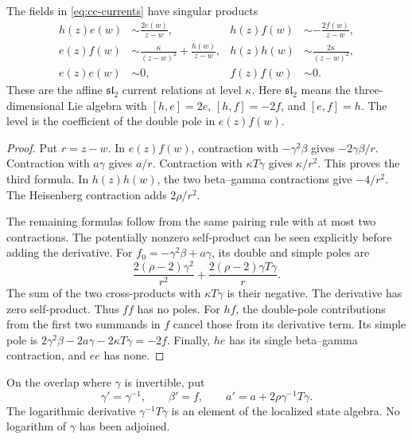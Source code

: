\begin{proposition}\label{prop:cc-current-poles}
The fields in \eqref{eq:cc-currents} have singular products
\begin{align*}
 h(z)e(w)&\sim\frac{2e(w)}{z-w},&
 h(z)f(w)&\sim-\frac{2f(w)}{z-w},\\
 e(z)f(w)&\sim\frac{\kappa}{(z-w)^2}+\frac{h(w)}{z-w},&
 h(z)h(w)&\sim\frac{2\kappa}{(z-w)^2},\\
 e(z)e(w)&\sim0,& f(z)f(w)&\sim0.
\end{align*}
These are the affine $\mathfrak{sl}_2$ current relations at level $\kappa$.
Here $\mathfrak{sl}_2$ means the three-dimensional Lie algebra with
$[h,e]=2e$, $[h,f]=-2f$, and $[e,f]=h$.
The level is the coefficient of the double pole in $e(z)f(w)$.
\end{proposition}
\begin{proof}
Put $r=z-w$.
In $e(z)f(w)$, contraction with $-\gamma^2\beta$ gives $-2\gamma\beta/r$.
Contraction with $a\gamma$ gives $a/r$.
Contraction with $\kappa T\gamma$ gives $\kappa/r^2$.
This proves the third formula.
In $h(z)h(w)$, the two beta--gamma contractions give $-4/r^2$.
The Heisenberg contraction adds $2\rho/r^2$.

The remaining formulas follow from the same pairing rule with at most two contractions.
The potentially nonzero self-product can be seen explicitly before adding the derivative.
For $f_0=-\gamma^2\beta+a\gamma$, its double and simple poles are
\[
 \frac{2(\rho-2)\gamma^2}{r^2}
 +\frac{2(\rho-2)\gamma T\gamma}{r}.
\]
The sum of the two cross-products with $\kappa T\gamma$ is their negative.
The derivative has zero self-product.
Thus $ff$ has no poles.
For $hf$, the double-pole contributions from the first two summands in $f$ cancel those from its derivative term.
Its simple pole is
$2\gamma^2\beta-2a\gamma-2\kappa T\gamma=-2f$.
Finally, $he$ has its single beta--gamma contraction, and $ee$ has none.
\end{proof}

On the overlap where $\gamma$ is invertible, put
\begin{equation}\label{eq:cc-transition}
 \gamma'=\gamma^{-1},\qquad
 \beta'=f,\qquad
 a'=a+2\rho\gamma^{-1}T\gamma.
\end{equation}
The logarithmic derivative $\gamma^{-1}T\gamma$ is an element of the localized state algebra.
No logarithm of $\gamma$ has been adjoined.

